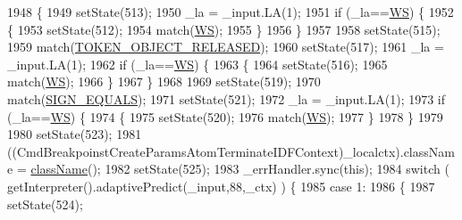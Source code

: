 \begin{DoxyCode}
1948         \{
1949         setState(513);
1950         \_la = \_input.LA(1);
1951         \textcolor{keywordflow}{if} (\_la==\hyperlink{classgov_1_1nasa_1_1jpf_1_1inspector_1_1server_1_1expression_1_1parser_1_1_expression_grammar_parser_ace44714ae633c7b14794cc5a24d9ebf3}{WS}) \{
1952           \{
1953           setState(512);
1954           match(\hyperlink{classgov_1_1nasa_1_1jpf_1_1inspector_1_1server_1_1expression_1_1parser_1_1_expression_grammar_parser_ace44714ae633c7b14794cc5a24d9ebf3}{WS});
1955           \}
1956         \}
1957 
1958         setState(515);
1959         match(\hyperlink{classgov_1_1nasa_1_1jpf_1_1inspector_1_1server_1_1expression_1_1parser_1_1_expression_grammar_parser_ad965e0dcfe9c8dde9be01f282a17f30e}{TOKEN\_OBJECT\_RELEASED});
1960         setState(517);
1961         \_la = \_input.LA(1);
1962         \textcolor{keywordflow}{if} (\_la==\hyperlink{classgov_1_1nasa_1_1jpf_1_1inspector_1_1server_1_1expression_1_1parser_1_1_expression_grammar_parser_ace44714ae633c7b14794cc5a24d9ebf3}{WS}) \{
1963           \{
1964           setState(516);
1965           match(\hyperlink{classgov_1_1nasa_1_1jpf_1_1inspector_1_1server_1_1expression_1_1parser_1_1_expression_grammar_parser_ace44714ae633c7b14794cc5a24d9ebf3}{WS});
1966           \}
1967         \}
1968 
1969         setState(519);
1970         match(\hyperlink{classgov_1_1nasa_1_1jpf_1_1inspector_1_1server_1_1expression_1_1parser_1_1_expression_grammar_parser_a4dc93cc6563a32e75e7006cb71acb7b7}{SIGN\_EQUALS});
1971         setState(521);
1972         \_la = \_input.LA(1);
1973         \textcolor{keywordflow}{if} (\_la==\hyperlink{classgov_1_1nasa_1_1jpf_1_1inspector_1_1server_1_1expression_1_1parser_1_1_expression_grammar_parser_ace44714ae633c7b14794cc5a24d9ebf3}{WS}) \{
1974           \{
1975           setState(520);
1976           match(\hyperlink{classgov_1_1nasa_1_1jpf_1_1inspector_1_1server_1_1expression_1_1parser_1_1_expression_grammar_parser_ace44714ae633c7b14794cc5a24d9ebf3}{WS});
1977           \}
1978         \}
1979 
1980         setState(523);
1981         ((CmdBreakpoinstCreateParamsAtomTerminateIDFContext)\_localctx).className = 
      \hyperlink{classgov_1_1nasa_1_1jpf_1_1inspector_1_1server_1_1expression_1_1parser_1_1_expression_grammar_parser_aafe03b251eef204ae911768faa5fd862}{className}();
1982         setState(525);
1983         \_errHandler.sync(\textcolor{keyword}{this});
1984         \textcolor{keywordflow}{switch} ( getInterpreter().adaptivePredict(\_input,88,\_ctx) ) \{
1985         \textcolor{keywordflow}{case} 1:
1986           \{
1987           setState(524);

\end{DoxyCode}
